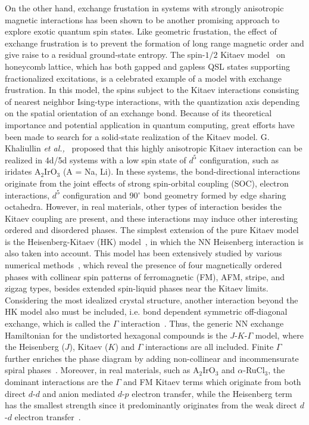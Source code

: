 \documentclass[aps,prb,reprint,amsfonts,amsmath,amssymb,showpacs,groupedaddress,superscriptaddress]{revtex4-1}
\begin{document}
On the other hand, exchange frustation in systems with strongly anisotropic magnetic interactions has been shown to be another promising approach to explore exotic quantum spin states. Like geometric frustation, the effect of exchange frustration is to prevent the formation of long range magnetic order and give raise to a residual ground-state entropy. The spin-$1/2$ Kitaev model~\cite{Kitaev2006} on honeycomb lattice, which has both gapped and gapless QSL states supporting fractionalized excitations, is a celebrated example of a model with exchange frustration. In this model, the spins subject to the Kitaev interactions consisting of nearest neighbor Ising-type interactions, with the quantization axis depending on the spatial orientation of an exchange bond. Because of its theoretical importance and potential application in quantum computing, great efforts have been made to search for a solid-state realization of the Kitaev model. G. Khaliullin \emph{et al.,}~\cite{Khaliullin2005,PhysRevLett.102.017205} proposed that this highly anisotropic Kitaev interaction can be realized in 4d/5d systems with a low spin state of $d^5$ configuration, such as iridates A$_2$IrO$_3$ (A = Na, Li). In these systems, the bond-directional interactions originate from the joint effects of strong spin-orbital coupling (SOC), electron interactions, $d^5$ configuration and 90$^\circ$ bond geometry formed by edge sharing octahedra. However, in real materials, other types of interaction besides the Kitaev coupling are present, and these interactions may induce other interesting ordered and disordered phases. The simplest extension of the pure Kitaev model is the Heisenberg-Kitaev (HK) model~\cite{PhysRevLett.105.027204}, in which the NN Heisenberg interaction is also taken into account. This model has been extensively studied by various numerical methods~\cite{PhysRevLett.110.097204,PhysRevB.83.245104,PhysRevB.84.100406,PhysRevB.90.195102,PhysRevLett.119.157203}, which reveal the presence of four magnetically ordered phases with collinear spin patterns of ferromagnetic (FM), AFM, stripe, and zigzag types, besides extended spin-liquid phases near the Kitaev limits. Considering the most idealized crystal structure, another interaction beyond the HK model also must be included, i.e. bond dependent symmetric off-diagonal exchange, which is called the $\Gamma$ interaction~\cite{PhysRevLett.112.077204,PhysRevB.93.214431,PhysRevB.96.115103}. Thus, the generic NN exchange Hamiltonian for the undistorted hexagonal compounds is the $J$-$K$-$\Gamma$ model, where the Heisenberg ($J$), Kitaev ($K$) and $\Gamma$ interactions are all included. Finite $\Gamma$ further enriches the phase diagram by adding non-collinear and incommensurate spiral phases~\cite{PhysRevLett.112.077204}. Moreover, in real materials, such as A$_2$IrO$_3$ and $\alpha$-RuCl$_{3}$, the dominant interactions are the $\Gamma$ and FM Kitaev terms which originate from both direct $d$-$d$ and anion mediated $d$-$p$ electron transfer, while the Heisenberg term has the smallest strength since it predominantly originates from the weak direct $d$-$d$ electron transfer~\cite{PhysRevLett.112.077204,PhysRevB.93.214431,PhysRevB.96.115103}.
\end{document}

